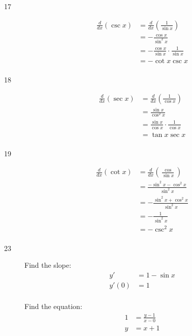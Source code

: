 \documentclass[letterpaper, landscape]{exam}
\begin{document}
\begin{description}
    \item[17] 
      \begin{align*}
          \frac{d}{dx} (\csc x) & = \frac{d}{dx} \left( \frac{1}{\sin x} \right) \\
                                & = - \frac{\cos x}{\sin^2 x} \\
                                & = - \frac{\cos x}{\sin x} \cdot \frac{1}{\sin x} \\
                                & = - \cot x \csc x \\
      \end{align*}

    \item[18] 
      \begin{align*}
          \frac{d}{dx} (\sec x) & = \frac{d}{dx} \left( \frac{1}{\cos x} \right) \\
                                & = \frac{\sin x}{\cos^2 x} \\
                                & = \frac{\sin x}{\cos x} \cdot \frac{1}{\cos x} \\
                                & = \tan x \sec x \\
      \end{align*}

    \item[19] 
      \begin{align*}
          \frac{d}{dx} (\cot x) & = \frac{d}{dx} \left( \frac{\cos}{\sin x} \right) \\
                                & = \frac{- \sin^2 x - \cos^2 x}{\sin^2 x} \\
                                & = - \frac{\sin^2 x + \cos^2 x}{\sin^2 x} \\
                                & = - \frac{1}{\sin^2 x} \\
                                & = - \csc^2 x \\
      \end{align*}

    \item[23] 
      Find the slope:
      \begin{align*}
        y'    & = 1 - \sin x \\
        y'(0) & = 1 \\
      \end{align*}

      Find the equation:
      \begin{align*}
        1     & = \frac{y - 1}{x - 0} \\
        y     & = x + 1 \\
      \end{align*}


\end{description}
\end{document}
